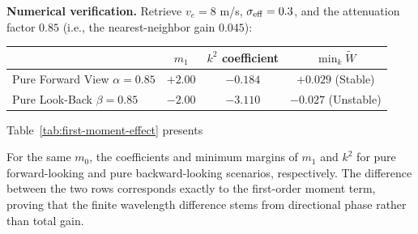\documentclass[11pt,a4paper,openany]{book}
\numberwithin{equation}{chapter}
\numberwithin{figure}{chapter}
\numberwithin{table}{chapter}
\newcommand{\tabletext}[2]{%
  \par\smallskip\noindent
  Table~\ref{#1} presents #2
\par\smallskip
}
\begin{document}
\textbf{Numerical verification.} Retrieve $v_e=8$ m/s, $\sigma_{\rm eff}=0.3$, and the attenuation factor $0.85$ (i.e., the nearest-neighbor gain $0.045$):










\begin{center}
\label{tab:first-moment-effect}
\begin{tabular}{lccc}
\toprule
& $m_1$ &




$k^2$ coefficient




& $\min_k\widetilde W$ \\
\midrule







Pure Forward View $\alpha=0.85$




& $+2.00$ & $-0.184$ &




$+0.029$ (Stable)



\\







Pure Look-Back $\beta=0.85$




& $-2.00$ & $-3.110$ &




 $-0.027$ (Unstable)



\\
\bottomrule
\end{tabular}
\end{center}
\tabletext{tab:first-moment-effect}{




For the same $m_0$, the coefficients and minimum margins of $m_1$ and $k^2$ for pure forward-looking and pure backward-looking scenarios, respectively. The difference between the two rows corresponds exactly to the first-order moment term, proving that the finite wavelength difference stems from directional phase rather than total gain.}
\end{document}
